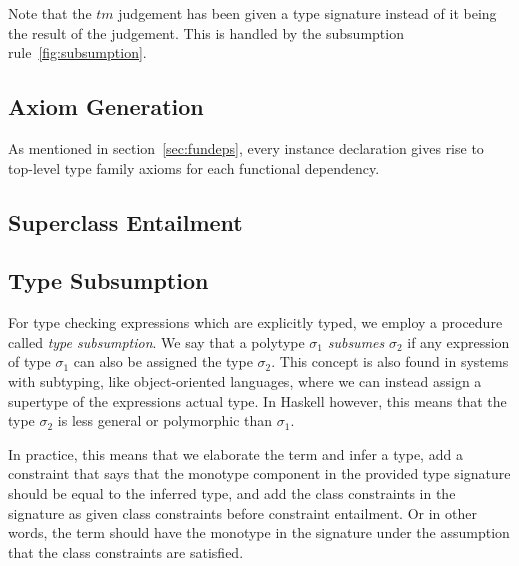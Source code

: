 Note that the $tm$ judgement has been given a type signature instead of
it being the result of the judgement. This is handled by the subsumption
rule~\ref{fig:subsumption}.
\subsection{Axiom Generation}
As mentioned in section~\ref{sec:fundeps}, every instance declaration gives rise
to top-level type family axioms for each functional dependency.
\subsection{Superclass Entailment}


\subsection{Type Subsumption}
For type checking expressions which are explicitly typed, we employ a procedure
called \textit{type subsumption}. We say that a polytype $\sigma_1$
\textit{subsumes} $\sigma_2$ if any expression of type $\sigma_1$ can also be
assigned the type $\sigma_2$. This concept is also found in systems with
subtyping, like object-oriented languages, where we can instead assign a
supertype of the expressions actual type. In Haskell however, this means that
the type $\sigma_2$ is less general or polymorphic than $\sigma_1$.

In practice, this means that we elaborate the term and infer a type, add a
constraint that says that the monotype component in the provided type signature
should be equal to the inferred type, and add the class constraints in the
signature as given class constraints before constraint entailment. Or in other
words, the term should have the monotype in the signature under the assumption
that the class constraints are satisfied.

